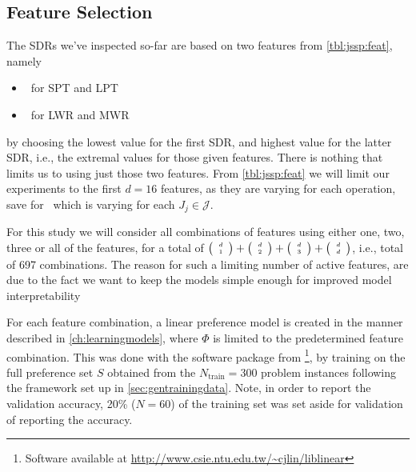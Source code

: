 \documentclass[smallextended]{svjour3}
\begin{document}
\subsection{Feature Selection}
The SDRs we've inspected so-far are based on two features from
\cref{tbl:jssp:feat}, namely
\begin{itemize}
    \item \phiproc\ for SPT and LPT 
    \item \phiwrmJob\ for LWR and MWR 
\end{itemize}
by choosing the lowest value for the first SDR, and highest value for the 
latter SDR, i.e., the extremal values for those given features. 
There is nothing that limits us to using just those two features. 
From \cref{tbl:jssp:feat} we will limit our experiments to the first $d=16$ 
features, as they are varying for each operation, save for \phitotalProc\ which 
is varying for each $J_j\in\mathcal{J}$. 

For this study we will consider all combinations of features using either one,
two, three or all of the features, for a total of
$\tiny \left(\begin{array}{c}d\\1\end{array}\right)+\tiny \left(\begin{array}{c}d\\2\end{array}\right)+\tiny \left(\begin{array}{c}d\\3\end{array}\right)+\tiny \left(\begin{array}{c}d\\d\end{array}\right)$, i.e., total
of 697 combinations. The reason for such a limiting number of active features,
are due to the fact we want to keep the models simple enough for improved model
interpretability

For each feature combination, a linear preference model is created in the
manner described in \cref{ch:learningmodels}, where $\Phi$ is limited to the
predetermined feature combination. This was done with the software package from
\cite{liblinear}\footnote{Software available at 
    \url{http://www.csie.ntu.edu.tw/~cjlin/liblinear}},
by training on the full preference set $S$ obtained from the
$N_{\text{train}}=300$ problem instances following the framework set up in
\cref{sec:gentrainingdata}. 
Note, in order to report the validation accuracy, 20\% ($N=60$) of the training 
set was set aside for validation of reporting the accuracy.
\end{document}

